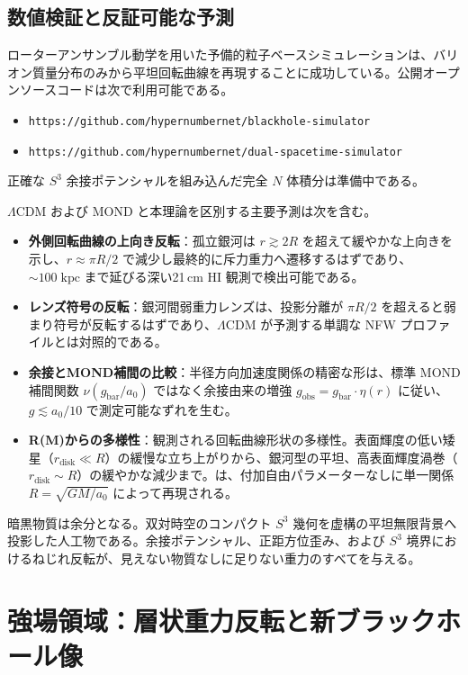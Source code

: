 \documentclass[a4paper]{article}
\begin{document}
\subsection{数値検証と反証可能な予測}

ローターアンサンブル動学を用いた予備的粒子ベースシミュレーションは、バリオン質量分布のみから平坦回転曲線を再現することに成功している。公開オープンソースコードは次で利用可能である。
\begin{itemize}
  \item \texttt{https://github.com/hypernumbernet/blackhole-simulator}
  \item \texttt{https://github.com/hypernumbernet/dual-spacetime-simulator}
\end{itemize}
正確な $S^3$ 余接ポテンシャルを組み込んだ完全 $N$ 体積分は準備中である。

$\Lambda$CDM および MOND と本理論を区別する主要予測は次を含む。
\begin{itemize}
  \item \textbf{外側回転曲線の上向き反転}：孤立銀河は $r \gtrsim 2R$ を超えて緩やかな上向きを示し、$r \approx \pi R/2$ で減少し最終的に斥力重力へ遷移するはずであり、$\sim 100\;\mathrm{kpc}$ まで延びる深い21\,cm HI 観測で検出可能である。
  \item \textbf{レンズ符号の反転}：銀河間弱重力レンズは、投影分離が $\pi R/2$ を超えると弱まり符号が反転するはずであり、$\Lambda$CDM が予測する単調な NFW プロファイルとは対照的である。
  \item \textbf{余接とMOND補間の比較}：半径方向加速度関係の精密な形は、標準 MOND 補間関数 $\nu(g_{\text{bar}}/a_0)$ ではなく余接由来の増強 $g_{\text{obs}} = g_{\text{bar}} \cdot \eta(r)$ に従い、$g \lesssim a_0/10$ で測定可能なずれを生む。
  \item \textbf{R(M)からの多様性}：観測される回転曲線形状の多様性。表面輝度の低い矮星（$r_{\text{disk}} \ll R$）の緩慢な立ち上がりから、銀河型の平坦、高表面輝度渦巻（$r_{\text{disk}} \sim R$）の緩やかな減少まで。は、付加自由パラメーターなしに単一関係 $R = \sqrt{GM/a_0}$ によって再現される。
\end{itemize}

暗黒物質は余分となる。双対時空のコンパクト $S^3$ 幾何を虚構の平坦無限背景へ投影した人工物である。余接ポテンシャル、正距方位歪み、および $S^3$ 境界におけるねじれ反転が、見えない物質なしに足りない重力のすべてを与える。

\section{強場領域：層状重力反転と新ブラックホール像}
\label{sec:strongfield}
\end{document}
